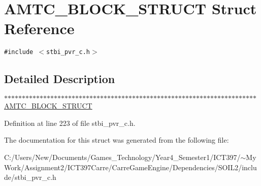 \hypertarget{struct_a_m_t_c___b_l_o_c_k___s_t_r_u_c_t}{
\section{AMTC\_\-BLOCK\_\-STRUCT Struct Reference}
\label{struct_a_m_t_c___b_l_o_c_k___s_t_r_u_c_t}
}
{\tt \#include $<$stbi\_\-pvr\_\-c.h$>$}



\subsection{Detailed Description}
$\ast$$\ast$$\ast$$\ast$$\ast$$\ast$$\ast$$\ast$$\ast$$\ast$$\ast$$\ast$$\ast$$\ast$$\ast$$\ast$$\ast$$\ast$$\ast$$\ast$$\ast$$\ast$$\ast$$\ast$$\ast$$\ast$$\ast$$\ast$$\ast$$\ast$$\ast$$\ast$$\ast$$\ast$$\ast$$\ast$$\ast$$\ast$$\ast$$\ast$$\ast$$\ast$$\ast$$\ast$$\ast$$\ast$$\ast$$\ast$$\ast$$\ast$$\ast$$\ast$$\ast$$\ast$$\ast$$\ast$$\ast$$\ast$$\ast$$\ast$$\ast$$\ast$$\ast$$\ast$$\ast$$\ast$$\ast$$\ast$$\ast$$\ast$$\ast$  \hyperlink{struct_a_m_t_c___b_l_o_c_k___s_t_r_u_c_t}{AMTC\_\-BLOCK\_\-STRUCT}  

Definition at line 223 of file stbi\_\-pvr\_\-c.h.

The documentation for this struct was generated from the following file:\begin{CompactItemize}
\item 
C:/Users/New/Documents/Games\_\-Technology/Year4\_\-Semester1/ICT397/$\sim$My Work/Assignment2/ICT397Carre/CarreGameEngine/Dependencies/SOIL2/include/stbi\_\-pvr\_\-c.h\end{CompactItemize}
